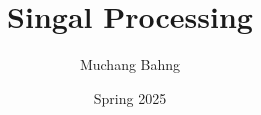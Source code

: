 \documentclass{article}
\begin{document}
\title{Singal Processing}
\author{Muchang Bahng}
\date{Spring 2025}

\maketitle
\tableofcontents
\pagebreak





\end{document}
